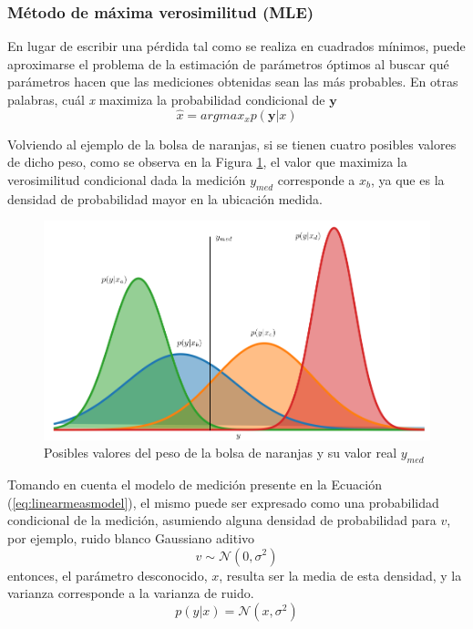 \subsubsection{Método de máxima verosimilitud (MLE)}

En lugar de escribir una pérdida tal como se realiza en cuadrados mínimos, puede aproximarse el problema de la estimación de parámetros óptimos al buscar qué parámetros hacen que las mediciones obtenidas sean las más probables. En otras palabras, cuál \textit{x} maximiza la probabilidad condicional de $\bm{y}$
\begin{equation}
    \hat{x} = argmax_x p(\bm{y}|x)
    \label{eq:maxlikelihood}
\end{equation}

Volviendo al ejemplo de la bolsa de naranjas, si se tienen cuatro posibles valores de dicho peso, como se observa en la Figura \ref{fig:mostlikelyproba}, el valor que maximiza la verosimilitud condicional dada la medición $y_{med}$ corresponde a $x_b$, ya que es la densidad de probabilidad mayor en la ubicación medida.
\begin{figure}[!h]
    \centering
    \includegraphics[width=\textwidth]{Img/MostLikelyProba.png}
    \caption{Posibles valores del peso de la bolsa de naranjas y su valor real $y_{med}$}
    \label{fig:mostlikelyproba}
\end{figure}

Tomando en cuenta el modelo de medición presente en la Ecuación (\ref{eq:linearmeasmodel}), el mismo puede ser expresado como una probabilidad condicional de la medición, asumiendo alguna densidad de probabilidad para $v$, por ejemplo, ruido blanco Gaussiano aditivo
\begin{equation}
    v \sim \mathcal{N}(0,\sigma^2)
\end{equation}
entonces, el parámetro desconocido, $x$, resulta ser la media de esta densidad, y la varianza corresponde a la varianza de ruido.
\begin{equation}
    p(y|x) = \mathcal{N}(x,\sigma^2)
\end{equation}

